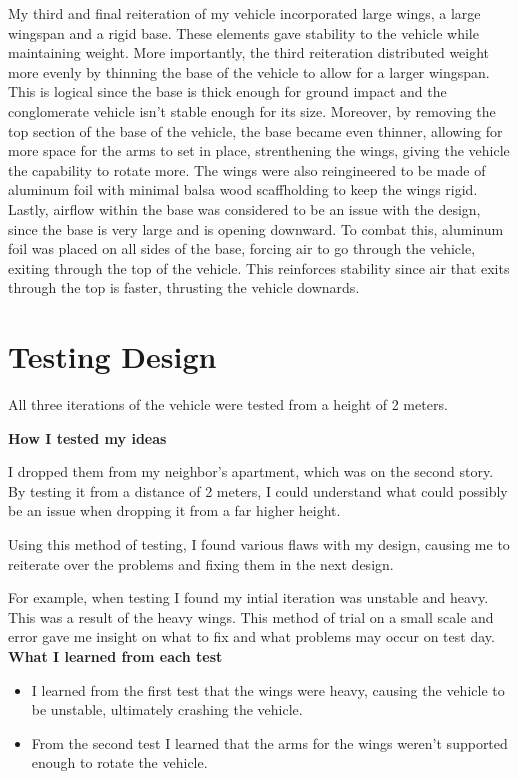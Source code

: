 \documentclass[12pt]{report}
\begin{document}
My third and final reiteration of my vehicle incorporated large wings, a large wingspan and a rigid base. These elements gave stability to the vehicle while maintaining weight. More importantly, the third reiteration distributed weight more evenly by thinning the base of the vehicle to allow for a larger wingspan. This is logical since the base is thick enough for ground impact and the conglomerate vehicle isn't stable enough for its size. Moreover, by removing the top section of the base of the vehicle, the base became even thinner, allowing for more space for the arms to set in place, strenthening the wings, giving the vehicle the capability to rotate more. The wings were also reingineered to be made of aluminum foil with minimal balsa wood scaffholding to keep the wings rigid. Lastly, airflow within the base was considered to be an issue with the design, since the base is very large and is opening downward. To combat this, aluminum foil was placed on all sides of the base, forcing air to go through the vehicle, exiting through the top of the vehicle. This reinforces stability since air that exits through the top is faster, thrusting the vehicle downards.

\section{Testing Design}
All three iterations of the vehicle were tested from a height of 2 meters.\newline 


\hspace*{-0.7cm}\textbf{How I tested my ideas}


I dropped them from my neighbor's apartment, which was on the second story. By testing it from a distance of 2 meters, I could understand what could possibly be an issue when dropping it from a far higher height.

Using this method of testing, I found various flaws with my design, causing me to reiterate over the problems and fixing them in the next design.

For example, when testing I found my intial iteration was unstable and heavy. This was a result of the heavy wings. This method of trial on a small scale and error gave me insight on what to fix and what problems may occur on test day.\newline \newline
\textbf{What I learned from each test}
\begin{itemize}
	\item I learned from the first test that the wings were heavy, causing the vehicle to be unstable, ultimately crashing the vehicle.
 	\item From the second test I learned that the arms for the wings weren't supported enough to rotate the vehicle.
\end{itemize}
\end{document}
